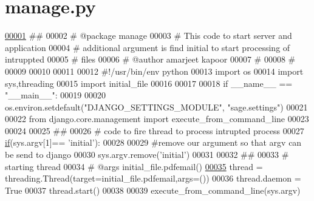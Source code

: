 \hypertarget{manage_8py_source}{}\section{manage.\+py}
\label{manage_8py_source}

\begin{DoxyCode}
\hypertarget{manage_8py_source_l00001}{}\hyperlink{namespacemanage}{00001} \textcolor{comment}{##}
00002 \textcolor{comment}{# @package manage}
00003 \textcolor{comment}{# This code to start server and application }
00004 \textcolor{comment}{# additional argument is find initial to start processing of intruppted }
00005 \textcolor{comment}{# files }
00006 \textcolor{comment}{# @author amarjeet kapoor}
00007 \textcolor{comment}{# }
00008 \textcolor{comment}{#}
00009  
00010 
00011 
00012 \textcolor{comment}{#!/usr/bin/env python}
00013 \textcolor{keyword}{import} os
00014 \textcolor{keyword}{import} sys,threading
00015 \textcolor{keyword}{import} initial\_file
00016 
00017 
00018 \textcolor{keywordflow}{if} \_\_name\_\_ == \textcolor{stringliteral}{"\_\_main\_\_"}:
00019 
00020     os.environ.setdefault(\textcolor{stringliteral}{"DJANGO\_SETTINGS\_MODULE"}, \textcolor{stringliteral}{"sage.settings"})
00021 
00022     \textcolor{keyword}{from} django.core.management \textcolor{keyword}{import} execute\_from\_command\_line
00023     
00024     
00025     \textcolor{comment}{##}
00026     \textcolor{comment}{# code to fire thread to process intrupted process}
00027     \hyperlink{bootstrap_8min_8js_ac2d69f5011896c6ed4a54e0dd36f6334}{if}(sys.argv[1]== \textcolor{stringliteral}{'initial'}):
00028         
00029         \textcolor{comment}{#remove our argument so that argv can be send to django}
00030         sys.argv.remove(\textcolor{stringliteral}{'initial'})
00031         
00032         \textcolor{comment}{## }
00033         \textcolor{comment}{# starting thread}
00034         \textcolor{comment}{# @args initial\_file.pdfemail()}
\hypertarget{manage_8py_source_l00035}{}\hyperlink{namespacemanage_ab0c13dd165a5c8a6f3e3c029a2acd921}{00035}         thread = threading.Thread(target=initial\_file.pdfemail,args=())
00036         thread.daemon = \textcolor{keyword}{True}
00037         thread.start()
00038 
00039     execute\_from\_command\_line(sys.argv)
\end{DoxyCode}
